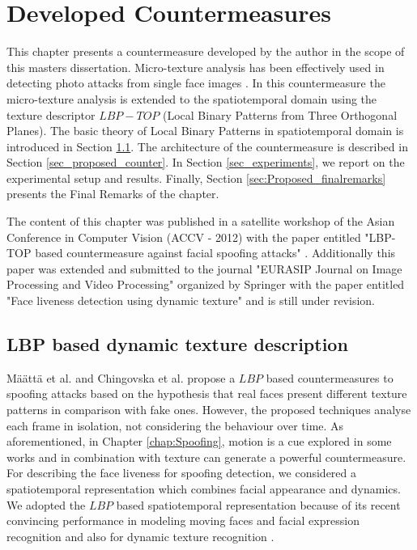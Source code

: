 \chapter{Developed Countermeasures}
\label{chap:Proposed_Countermeasures}

This chapter presents a countermeasure developed by the author in the scope of this masters dissertation. Micro-texture analysis has been effectively used in detecting photo attacks from single face images \cite{bai2010physics,maatta2011face,ChingovskaBIOSIG2012}. In this countermeasure the micro-texture analysis is extended to the spatiotemporal domain using the texture descriptor $LBP-TOP$ (Local Binary Patterns from Three Orthogonal Planes). The basic theory of Local Binary Patterns in spatiotemporal domain is introduced in Section \ref{sec_dynamic}. The architecture of the countermeasure is described in Section \ref{sec_proposed_counter}. In Section \ref{sec_experiments}, we report on the experimental setup and results. Finally, Section \ref{sec:Proposed_finalremarks} presents the Final Remarks of the chapter.

The content of this chapter was published in a satellite workshop of the Asian Conference in Computer Vision (ACCV - 2012) with the paper entitled "LBP-TOP based countermeasure against facial spoofing attacks" \cite{Pereira_LBP_2012}. Additionally this paper was extended and submitted to the journal "EURASIP Journal on Image Processing and Video Processing" organized by Springer with the paper entitled "Face liveness detection using dynamic texture" and is still under revision.

\section{LBP based dynamic texture description}
\label{sec_dynamic}

M\"{a}\"{a}tt\"{a} et al. \cite{maatta2011face} and Chingovska et al. \cite{ChingovskaBIOSIG2012} propose a $LBP$ based countermeasures to spoofing attacks based on the hypothesis that real faces  present different texture patterns in comparison with fake ones. However, the proposed techniques analyse each frame in isolation, not considering the behaviour over time. As aforementioned, in Chapter \ref{chap:Spoofing}, motion is a cue explored in some works and in combination with texture can generate a powerful countermeasure. For describing the face liveness for spoofing detection, we considered a spatiotemporal representation which combines facial appearance and dynamics. We adopted the $LBP$ based spatiotemporal representation because of its recent convincing performance in modeling moving faces and facial expression recognition and also for dynamic texture recognition \cite{inen2011computer}. 

